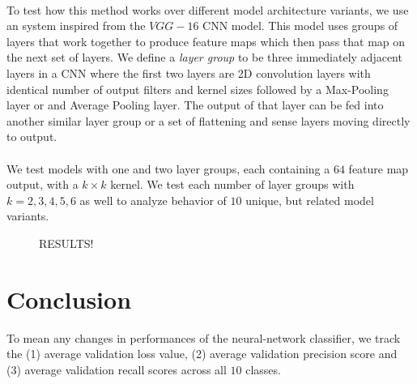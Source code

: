 \documentclass[12pt,letterpaper]{article}
\begin{document}
\paragraph*{}To test how this method works over different model architecture variants, we use an system inspired from the $VGG-16$ CNN model. This model uses groups of layers that work together to produce feature maps which then pass that map on the next set of layers. We define a \textit{layer group} to be three immediately adjacent layers in a CNN where the first two layers are 2D convolution layers with identical number of output filters and kernel sizes followed by a Max-Pooling layer or and Average Pooling layer. The output of that layer can be fed into another similar layer group or a set of flattening and sense layers moving directly to output.

\paragraph*{}We test models with one and two layer groups, each containing a $64$ feature map output, with a $k \times k$ kernel. We test each number of layer groups with $k = 2,3,4,5,6$ as well to analyze behavior of $10$ unique, but related model variants.





\begin{figure}[H]
\label{results}
RESULTS!
\end{figure}

\section*{Conclusion}To mean any changes in performances of the neural-network classifier, we track the  (1) average validation loss value, (2) average validation precision score and (3) average validation recall scores across all $10$ classes.




\end{document}

